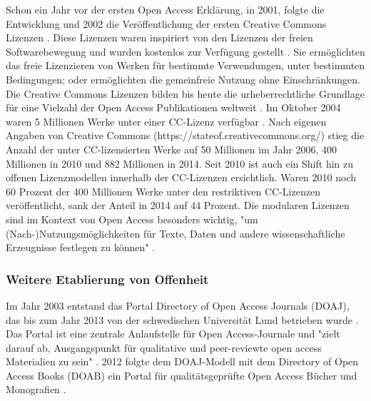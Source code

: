 Schon ein Jahr vor der ersten Open Access Erklärung, in 2001, folgte die Entwicklung und 2002 die Veröffentlichung der ersten Creative Commons Lizenzen \cite{garcia_2010_open}. Diese Lizenzen waren inspiriert von den Lizenzen der freien Softwarebewegung und wurden kostenlos zur Verfügung gestellt \cite{Minjeong_2007}. Sie ermöglichten das freie Lizenzieren von Werken für bestimmte Verwendungen, unter bestimmten Bedingungen; oder ermöglichten die gemeinfreie Nutzung ohne Einschränkungen. Die Creative Commons Lizenzen bilden bis heute die urheberrechtliche Grundlage für eine Vielzahl der Open Access Publikationen weltweit \cite{suchen}. Im Oktober 2004 waren 5 Millionen Werke unter einer CC-Lizenz verfügbar \cite{Suchen_Forbes_Movement_Seeks_Copyright_Alternatives}. Nach eigenen Angaben von Creative Commons (https://stateof.creativecommons.org/) stieg die Anzahl der unter CC-lizensierten Werke auf 50 Millionen im Jahr 2006, 400 Millionen in 2010 und 882 Millionen in 2014. Seit 2010 ist auch ein Shift hin zu offenen Lizenzmodellen innerhalb der CC-Lizenzen ersichtlich. Waren 2010 noch 60 Prozent der 400 Millionen Werke unter den restriktiven CC-Lizenzen veröffentlicht, sank der Anteil in 2014 auf 44 Prozent. Die modularen Lizenzen sind im Kontext von Open Access besonders wichtig, "um (Nach-)Nutzungsmöglichkeiten für Texte, Daten und andere wissenschaftliche Erzeugnisse festlegen zu können" \cite{suchen-Hoffmann-Zugang-undVerwertung-oeffentlicher-Informationen}.

\subsubsection{Weitere Etablierung von Offenheit}

Im Jahr 2003 entstand das Portal Directory of Open Access Journals (DOAJ), das bis zum Jahr 2013 von der schwedischen Universität Lund betrieben wurde \cite{doaj_2015_about}. Das Portal ist eine zentrale Anlaufstelle für Open Access-Journale \cite{suber_2015} und "zielt darauf ab, Ausgangspunkt für qualitative und peer-reviewte open access Materialien zu sein" \cite{doaj_2015_about}. 2012 folgte dem DOAJ-Modell mit dem Directory of Open Access Books (DOAB) ein Portal für qualitätsgeprüfte Open Access Bücher und Monografien \cite{adema_2013_political}.

